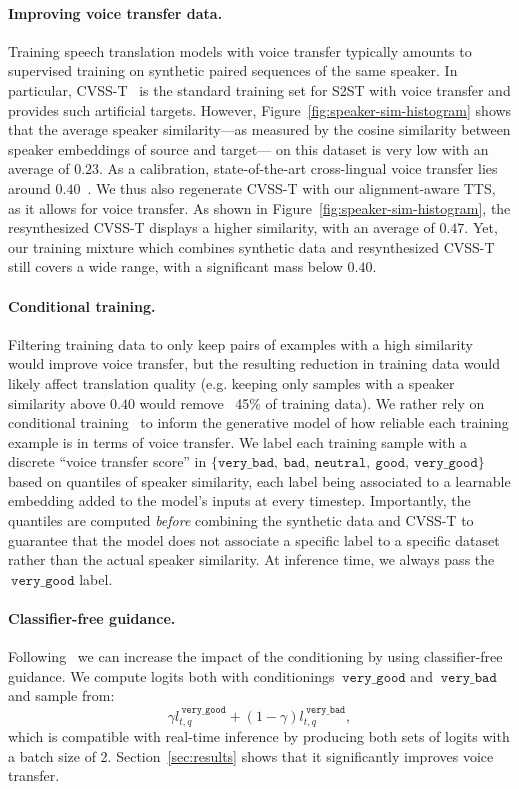 \paragraph{Improving voice transfer data.}
Training speech translation models with voice transfer typically amounts to supervised training on synthetic paired sequences of the same speaker.
In particular, CVSS-T~\cite{cvss} is the standard training set for S2ST with voice transfer and provides such artificial targets. However, Figure~\ref{fig:speaker-sim-histogram} shows that the average speaker similarity---as measured by the cosine similarity between speaker embeddings of source and target--- on this dataset is very low with an average of $0.23$. As a calibration, state-of-the-art cross-lingual voice transfer lies around $0.40$~\cite{audiopalm}. We thus also regenerate CVSS-T with our alignment-aware TTS, as it allows for voice transfer. As shown in Figure~\ref{fig:speaker-sim-histogram}, the resynthesized CVSS-T displays a higher similarity, with an average of $0.47$. Yet, our training mixture which combines synthetic data and resynthesized CVSS-T still covers a wide range, with a significant mass below $0.40$.

\paragraph{Conditional training.} Filtering training data to only keep pairs of examples with a high similarity would improve voice transfer, but the resulting reduction in training data would likely affect translation quality (e.g. keeping only samples with a speaker similarity above $0.40$ would remove ~45\% of training data). We rather rely on conditional training~\cite{socher_conditioned_2019, goal_conditioned_bowman} to inform the generative model of how reliable each training example is in terms of voice transfer. We label each training sample with a discrete ``voice transfer score'' in $\{\texttt{very\_bad},~\texttt{bad},~\texttt{neutral},~\texttt{good},~\texttt{very\_good}\}$ based on quantiles of speaker similarity, each label being associated to a learnable embedding added to the model's inputs at every timestep. Importantly, the quantiles are computed \emph{before} combining the synthetic data and CVSS-T to guarantee that the model does not associate a specific label to a specific dataset rather than the actual speaker similarity. At inference time, we always pass the $~\texttt{very\_good}$ label.

\paragraph{Classifier-free guidance.} Following~\citet{audiogen} we can increase the impact of the conditioning by using classifier-free guidance. We compute logits both with conditionings $~\texttt{very\_good}$ and $~\texttt{very\_bad}$ and sample from:
\begin{equation}
    \gamma l_{t, q}^{~\texttt{very\_good}} + (1 - \gamma) l_{t, q}^{~\texttt{very\_bad}}, 
\end{equation}
which is compatible with real-time inference by producing both sets of logits with a batch size of 2. Section~\ref{sec:results} shows that it significantly improves voice transfer.
